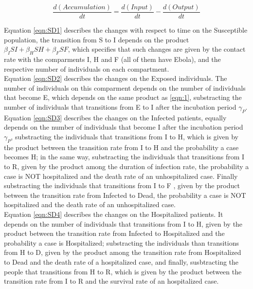 \begin{equation}
\frac{d (Accumulation)}{dt} = \frac{d (Input)}{dt} -\frac{d (Output)}{dt} \nonumber
\end{equation}


Equation \ref{eqn:SD1} describes the changes with respect to time on the Susceptible population, the transition from S to I depends on the product $\beta_{I}SI+\beta_{H}SH+\beta_{F}SF$, which specifies that such changes are given by the contact rate with the comparments I, H and F (all of them have Ebola), and the respective number of individuals on each compartment.\\

Equation \ref{eqn:SD2} describes the changes on the Exposed individuals. The number of individuals on this comparment depends on the number of individuals that become E, which depends on the same product as \ref{eqn:1}, substracting the number of individuals that transitions from E to I after the incubation period $\gamma_P$.\\

Equation \ref{eqn:SD3} describes the changes on the Infected patients, equally depends on the number of individuals that become I after the incubation period $\gamma_P$, substracting the individuals that transitions from I to H, which is given by the product between the transition rate from I to H and the probability a case becomes H; in the same way, substracting the individuals that transitions from I to R, given by  the product among the duration of infection rate, the probability a case is NOT hospitalized and the death rate of an unhospitalized case. Finally substracting the individuals that transitions from I to F , given by the product between the transition rate from Infected to Dead,  the probability a case is NOT hospitalized and the death rate of an unhospitalized case.\\

Equation \ref{eqn:SD4} describes the changes on the Hospitalized patients. It depends on the number of individuals that transitions from I to H, given by the  product between the transition rate from Infected to Hospitalized and the probability a case is Hospitalized;  substracting the individuals than transitions from H to D, given by the product among the transition rate from Hospitalized to Dead and the death rate of a hospitalized case, and finally, susbtracting the people that transitions from H to R, which is given by the product between the transition rate from I to R and the survival rate of an hospitalized case.\\

